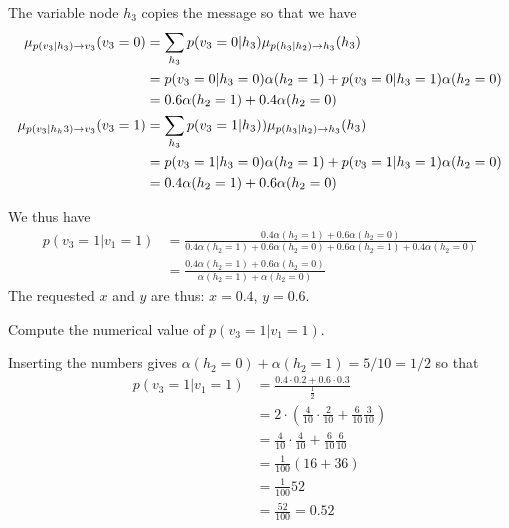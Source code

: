 \begin{exenumerate}
\begin{solution}
  The variable node $h_3$ copies the message so that we have
  \begin{align}
    \fxmess{p(v_3|h_3)}{v_3}{1}(v_3=0) & = \sum_{h_3} p(v_3=0 | h_3)  \fxmess{p(h_3|h_2)}{h_3}{1}(h_3) \\
    & =  p(v_3=0 | h_3=0)  \alpha(h_2 =1) + p(v_3=0 | h_3=1)  \alpha(h_2 =0)\\
    & = 0.6  \alpha(h_2 =1) + 0.4  \alpha(h_2 =0)\\
    \fxmess{p(v_3|h_h3)}{v_3}{1}(v_3=1) & = \sum_{h_3} p(v_3=1 | h_3) ) \fxmess{p(h_3|h_2)}{h_3}{1}(h_3) \\
    & = p(v_3=1 | h_3=0)  \alpha(h_2 =1) + p(v_3=1 | h_3=1)  \alpha(h_2 =0)\\
    & = 0.4 \alpha(h_2=1) + 0.6 \alpha(h_2=0)
  \end{align}

  We thus have
  \begin{align}
    p(v_3 = 1| v_1=1) &=  \frac{0.4 \alpha(h_2=1) + 0.6 \alpha(h_2=0)}{ 0.4 \alpha(h_2=1) + 0.6 \alpha(h_2=0) +  0.6  \alpha(h_2 =1) + 0.4  \alpha(h_2 =0)}\\
    & =  \frac{0.4 \alpha(h_2=1) + 0.6 \alpha(h_2=0)}{\alpha(h_2=1)+\alpha(h_2=0)}
  \end{align}
  The requested $x$ and $y$ are thus: $x =0.4$, $y=0.6$. 

    
  \end{solution}
  
\item Compute the numerical value of $p(v_3 =1 | v_1=1)$.

  
  \begin{solution}
    
    Inserting the numbers gives $\alpha(h_2=0)+\alpha(h_2=1) = 5/10 = 1/2$ so that
    \begin{align}
      p(v_3 = 1| v_1=1) &= \frac{0.4 \cdot 0.2 + 0.6 \cdot 0.3}{\frac{1}{2}}\\
      &= 2\cdot \left( \frac{4}{10} \cdot \frac{2}{10} + \frac{6}{10} \frac{3}{10}\right)\\
      &=  \frac{4}{10} \cdot \frac{4}{10} + \frac{6}{10} \frac{6}{10}\\
      &= \frac{1}{100} (16+ 36)\\
      &= \frac{1}{100} 52\\
      & = \frac{52}{100} = 0.52
    \end{align}

  \end{solution}
  
\end{exenumerate}
  

